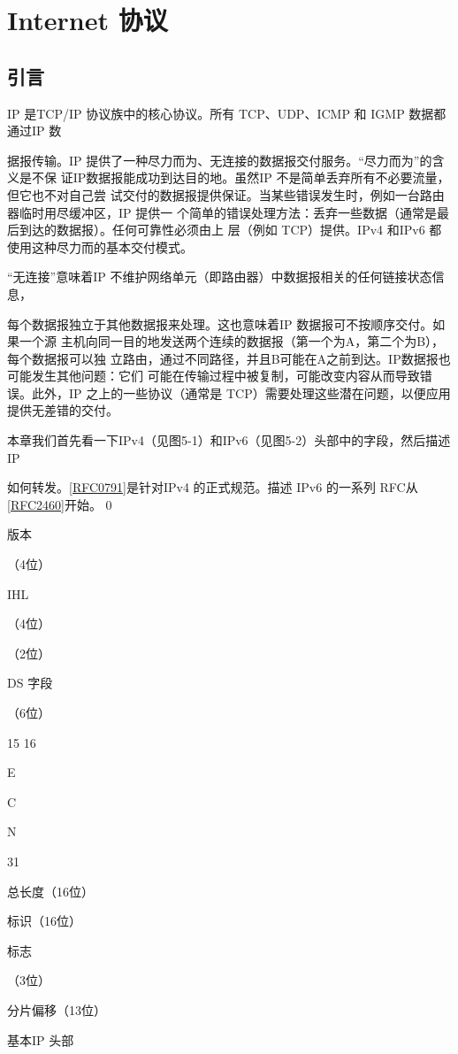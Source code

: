 \chapter{Internet 协议}
\section{引言}
IP 是TCP/IP 协议族中的核心协议。所有 TCP、UDP、ICMP 和 IGMP 数据都通过IP 数

据报传输。IP 提供了一种尽力而为、无连接的数据报交付服务。“尽力而为”的含义是不保
证IP数据报能成功到达目的地。虽然IP 不是简单丢弃所有不必要流量，但它也不对自己尝
试交付的数据报提供保证。当某些错误发生时，例如一台路由器临时用尽缓冲区，IP 提供一
个简单的错误处理方法：丢弃一些数据（通常是最后到达的数据报）。任何可靠性必须由上
层（例如 TCP）提供。IPv4 和IPv6 都使用这种尽力而的基本交付模式。

“无连接”意味着IP 不维护网络单元（即路由器）中数据报相关的任何链接状态信息，

每个数据报独立于其他数据报来处理。这也意味着IP 数据报可不按顺序交付。如果一个源
主机向同一目的地发送两个连续的数据报（第一个为A，第二个为B），每个数据报可以独
立路由，通过不同路径，并且B可能在A之前到达。IP数据报也可能发生其他问题：它们
可能在传输过程中被复制，可能改变内容从而导致错误。此外，IP 之上的一些协议（通常是
TCP）需要处理这些潜在问题，以便应用提供无差错的交付。

本章我们首先看一下IPv4（见图5-1）和IPv6（见图5-2）头部中的字段，然后描述IP

如何转发。\href{https://www.rfc-editor.org/rfc/rfc0791}{[RFC0791]}是针对IPv4 的正式规范。描述 IPv6 的一系列 RFC从\href{https://www.rfc-editor.org/rfc/rfc2460}{[RFC2460]}开始。
0

版本

（4位）

IHL

（4位）

（2位）

DS 字段

（6位）

15 16

E

C

N

31

总长度（16位）

标识（16位）

标志

（3位）

分片偏移（13位）

基本IP 头部

